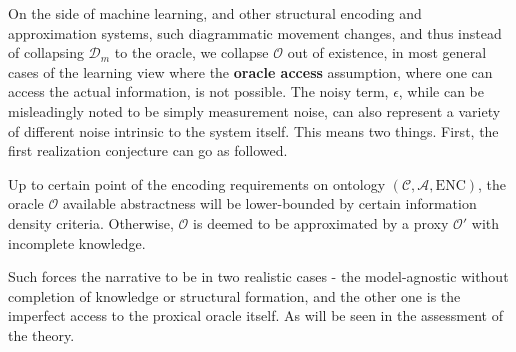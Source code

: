 On the side of machine learning, and other structural encoding and approximation systems, such diagrammatic movement changes, and thus instead of collapsing $\mathcal{D}_{m}$ to the oracle, we collapse $\mathcal{O}$ out of existence, in most general cases of the learning view where the \textbf{oracle access} assumption, where one can access the actual information, is not possible. The noisy term, $\epsilon$, while can be misleadingly noted to be simply measurement noise, can also represent a variety of different noise intrinsic to the system itself. This means two things. First, the first realization conjecture can go as followed. 

\begin{conjecture}
	Up to certain point of the encoding requirements on ontology $(\mathcal{C},\mathcal{A},\mathrm{ENC})$, the oracle $\mathcal{O}$ available abstractness will be lower-bounded by certain information density criteria. Otherwise, $\mathcal{O}$ is deemed to be approximated by a proxy $\mathcal{O}'$ with incomplete knowledge.
\end{conjecture}
Such forces the narrative to be in two realistic cases - the model-agnostic without completion of knowledge or structural formation, and the other one is the imperfect access to the proxical oracle itself. As will be seen in the assessment of the theory. 

